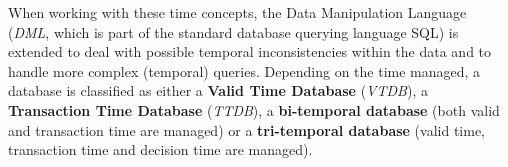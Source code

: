
When working with these time concepts, the Data Manipulation Language (\emph{DML}, which is part of the standard database querying language SQL) is extended to deal with possible temporal inconsistencies within the data and to handle more complex (temporal) queries. 
Depending on the time managed, a database is classified as either a \textbf{Valid Time Database} (\emph{VTDB}), a \textbf{Transaction Time Database} (\emph{TTDB}), a \textbf{bi-temporal database} (both valid and transaction time are managed) or a \textbf{tri-temporal database} (valid time, transaction time and decision time are managed).

	
	
